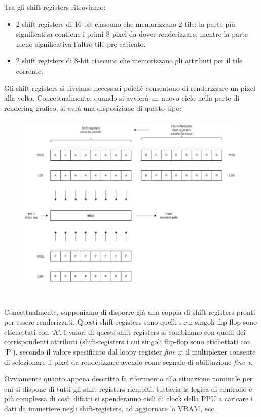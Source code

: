 \documentclass[11pt]{article}
\begin{document}
Tra gli shift registers ritroviamo:
\begin{itemize}
	\item{
	2 shift-registers di 16 bit ciascuno che memorizzano 2 tile; la parte più significativa contiene i primi 8 pixel da dover renderizzare, mentre la parte meno significativa l'altro tile pre-caricato.
	}
	\item{
	2 shift registers di 8-bit ciascuno che memorizzano gli attributi per il tile corrente.
	}
\end{itemize}
\clearpage
Gli shift registers si rivelano necessari poichè consentono di renderizzare un pixel alla volta. Concettualmente, quando si avvierà un nuovo ciclo nella parte di rendering grafico, si avrà una disposizione di questo tipo:
\begin{figure}[h]
\hspace*{-1.2cm}
\centering
\includegraphics[width=450px, height=330px]{PIXEL_RENDERING_LOGIC.png}
\end{figure}\\
Concettualmente, supponiamo di disporre già una coppia di shift-registers pronti per essere renderizzati. Questi shift-registers sono quelli i cui singoli flip-flop sono etichettati con `A'. I valori di questi shift-registers si combinano con quelli dei corrispondenti attributi (shift-registers i cui singoli flip-flop sono etichettati con `P'), secondo il valore specificato dal loopy register \emph{fine x}: il multiplexer consente di selezionare il pixel da renderizzare avendo come segnale di abilitazione \emph{fine x}. 

Ovviamente quanto appena descritto fa riferimento alla situazione nominale per cui si dispone di tutti gli shift-registers riempiti, tuttavia la logica di controllo è più complessa di così; difatti si spenderanno cicli di clock della PPU a caricare i dati da immettere negli shift-registers, ad aggiornare la VRAM, ecc.
\end{document}
